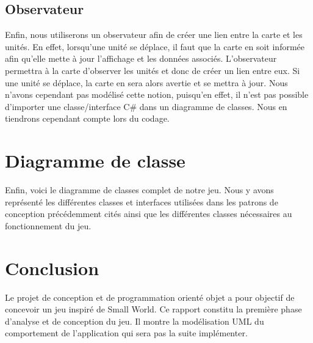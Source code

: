 \documentclass[a4paper]{article}%
\begin{document}
\subsection{Observateur}
Enfin, nous utiliserons un observateur afin de créer une lien entre la carte et les unités. En effet, lorsqu'une unité se déplace, il faut que la carte en soit informée afin qu'elle mette à jour l'affichage et les données associés. 
L'observateur permettra à la carte d'observer les unités et donc de créer un lien entre eux. Si une unité se déplace, la carte en sera alors avertie et se mettra à jour. 
Nous n'avons cependant pas modélisé cette notion, puisqu'en effet, il n'est pas possible d'importer une classe/interface C\# dans un diagramme de classes. Nous en tiendrons cependant compte lors du codage.


\section{Diagramme de classe}
Enfin, voici le diagramme de classes complet de notre jeu. Nous y avons représenté les différentes classes et interfaces utilisées dans les patrons de conception précédemment cités ainsi que les différentes classes nécessaires au fonctionnement du jeu.


\newpage

\section*{Conclusion}

Le projet de conception et de programmation orienté objet a pour objectif de concevoir un jeu inspiré de Small World. Ce rapport constitu la première phase d'analyse et de conception du jeu. Il montre la modélisation UML du comportement de l'application qui sera pas la suite implémenter.


\newpage
\listoffigures
\end{document}

